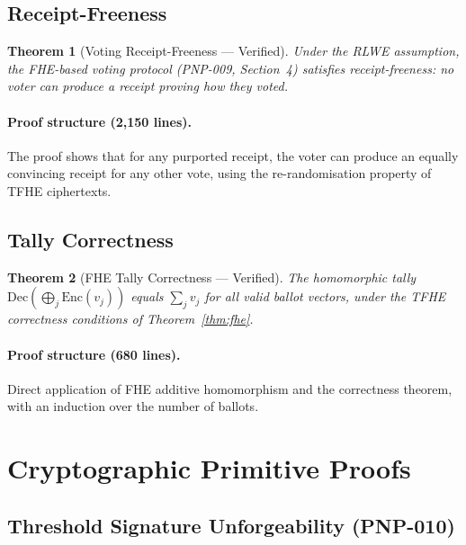 \documentclass[11pt,a4paper]{article}
\newtheorem{theorem}{Theorem}[section]
\begin{document}
\subsection{Receipt-Freeness}

\begin{theorem}[Voting Receipt-Freeness --- Verified]
\label{thm:receipt}
    Under the RLWE assumption, the FHE-based voting protocol (PNP-009,
    Section~4) satisfies receipt-freeness: no voter can produce a receipt
    proving how they voted.
\end{theorem}

\paragraph{Proof structure (2{,}150 lines).}
The proof shows that for any purported receipt, the voter can produce
an equally convincing receipt for any other vote, using the
re-randomisation property of TFHE ciphertexts.

\subsection{Tally Correctness}

\begin{theorem}[FHE Tally Correctness --- Verified]
\label{thm:tally}
    The homomorphic tally $\mathrm{Dec}(\bigoplus_j \mathrm{Enc}(v_j))$
    equals $\sum_j v_j$ for all valid ballot vectors, under the TFHE
    correctness conditions of Theorem~\ref{thm:fhe}.
\end{theorem}

\paragraph{Proof structure (680 lines).}
Direct application of FHE additive homomorphism and the correctness
theorem, with an induction over the number of ballots.

\section{Cryptographic Primitive Proofs}
\label{sec:crypto}

\subsection{Threshold Signature Unforgeability (PNP-010)}
\end{document}
